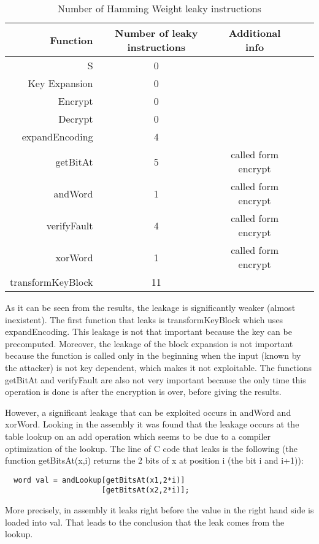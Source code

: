 \documentclass[conference]{IEEEtran}
\begin{document}
\begin{table}[htbp]
  \renewcommand{\arraystretch}{1.3}
  \caption{Number of Hamming Weight leaky instructions}
  \vspace{0.05 in}
  \label{tab:protected}
  \centering
  \begin{tabular}{r|cccp{0.5in}}
    Function & Number of leaky instructions & Additional info \\ \hline
    S  & 0 \\
    Key Expansion & 0 \\
    Encrypt & 0 \\
    Decrypt & 0 \\
    expandEncoding & 4 \\
    getBitAt & 5 & called form encrypt \\
    andWord & 1 & called form encrypt \\
    verifyFault & 4 & called form encrypt \\
    xorWord & 1 & called form encrypt \\
    transformKeyBlock& 11
  \end{tabular}
\end{table}

As it can be seen from the results, the leakage is significantly weaker (almost inexistent). The first function that leaks is transformKeyBlock which uses expandEncoding. This leakage is not that important because the key can be precomputed. Moreover, the leakage of the block expansion is not important because the function is called only in the beginning when the input (known by the attacker) is not key dependent, which makes it not exploitable. The functions getBitAt and verifyFault are also not very important because the only time this operation is done is after the encryption is over, before giving the results.

However, a significant leakage that can be exploited occurs in andWord and xorWord. Looking in the assembly it was found that the leakage occurs at the table lookup on an add operation which seems to be due to a compiler optimization of the lookup. The line of C code that leaks is the following (the function getBitsAt(x,i) returns the 2 bits of x at position i (the bit i and i+1)):
\begin{lstlisting}
  word val = andLookup[getBitsAt(x1,2*i)]
                      [getBitsAt(x2,2*i)];
\end{lstlisting}

More precisely, in assembly it leaks right before the value in the right hand side is loaded into val. That leads to the conclusion that the leak comes from the lookup.
\end{document}
